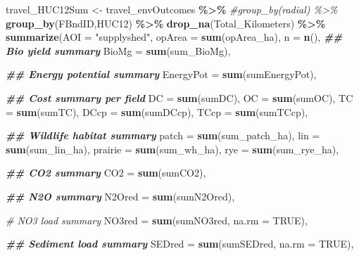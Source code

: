 \documentclass[
]{article}
\newenvironment{Shaded}{\begin{snugshade}}{\end{snugshade}}
\newcommand{\AttributeTok}[1]{\textcolor[rgb]{0.13,0.29,0.53}{#1}}
\newcommand{\CommentTok}[1]{\textcolor[rgb]{0.56,0.35,0.01}{\textit{#1}}}
\newcommand{\ConstantTok}[1]{\textcolor[rgb]{0.56,0.35,0.01}{#1}}
\newcommand{\DocumentationTok}[1]{\textcolor[rgb]{0.56,0.35,0.01}{\textbf{\textit{#1}}}}
\newcommand{\FunctionTok}[1]{\textcolor[rgb]{0.13,0.29,0.53}{\textbf{#1}}}
\newcommand{\NormalTok}[1]{#1}
\newcommand{\OtherTok}[1]{\textcolor[rgb]{0.56,0.35,0.01}{#1}}
\newcommand{\SpecialCharTok}[1]{\textcolor[rgb]{0.81,0.36,0.00}{\textbf{#1}}}
\newcommand{\StringTok}[1]{\textcolor[rgb]{0.31,0.60,0.02}{#1}}
\begin{document}
\begin{Shaded}
\begin{Highlighting}[]
\NormalTok{travel\_HUC12Sum }\OtherTok{\textless{}{-}}\NormalTok{ travel\_envOutcomes }\SpecialCharTok{\%\textgreater{}\%}
  \CommentTok{\#group\_by(radial) \%\textgreater{}\%}
  \FunctionTok{group\_by}\NormalTok{(FBndID,HUC12) }\SpecialCharTok{\%\textgreater{}\%}
  \FunctionTok{drop\_na}\NormalTok{(Total\_Kilometers) }\SpecialCharTok{\%\textgreater{}\%}
  \FunctionTok{summarize}\NormalTok{(}\AttributeTok{AOI =} \StringTok{"supplyshed"}\NormalTok{,}
            \AttributeTok{opArea =} \FunctionTok{sum}\NormalTok{(opArea\_ha),}
            \AttributeTok{n       =} \FunctionTok{n}\NormalTok{(),}
            \DocumentationTok{\#\# Bio yield summary}
            \AttributeTok{BioMg =} \FunctionTok{sum}\NormalTok{(sum\_BioMg),}
            
            \DocumentationTok{\#\# Energy potential summary}
            \AttributeTok{EnergyPot =} \FunctionTok{sum}\NormalTok{(sumEnergyPot),}

            \DocumentationTok{\#\# Cost summary per field}
            \AttributeTok{DC =} \FunctionTok{sum}\NormalTok{(sumDC),}
            \AttributeTok{OC =} \FunctionTok{sum}\NormalTok{(sumOC),}
            \AttributeTok{TC =} \FunctionTok{sum}\NormalTok{(sumTC),}
            \AttributeTok{DCcp =} \FunctionTok{sum}\NormalTok{(sumDCcp),}
            \AttributeTok{TCcp =} \FunctionTok{sum}\NormalTok{(sumTCcp),}
            
            \DocumentationTok{\#\# Wildlife habitat summary}
            \AttributeTok{patch =} \FunctionTok{sum}\NormalTok{(sum\_patch\_ha),}
            \AttributeTok{lin =} \FunctionTok{sum}\NormalTok{(sum\_lin\_ha),}
            \AttributeTok{prairie =} \FunctionTok{sum}\NormalTok{(sum\_wh\_ha),}
            \AttributeTok{rye =} \FunctionTok{sum}\NormalTok{(sum\_rye\_ha),}

            \DocumentationTok{\#\# CO2 summary}
            \AttributeTok{CO2 =} \FunctionTok{sum}\NormalTok{(sumCO2),}
            
            \DocumentationTok{\#\# N2O summary}
            \AttributeTok{N2Ored =} \FunctionTok{sum}\NormalTok{(sumN2Ored),}

            \CommentTok{\# NO3 load summary}
            \AttributeTok{NO3red =} \FunctionTok{sum}\NormalTok{(sumNO3red, }\AttributeTok{na.rm =} \ConstantTok{TRUE}\NormalTok{),}

            \DocumentationTok{\#\# Sediment load summary}
            \AttributeTok{SEDred =} \FunctionTok{sum}\NormalTok{(sumSEDred, }\AttributeTok{na.rm =} \ConstantTok{TRUE}\NormalTok{),}
            

\end{Highlighting}
\end{Shaded}
\end{document}
